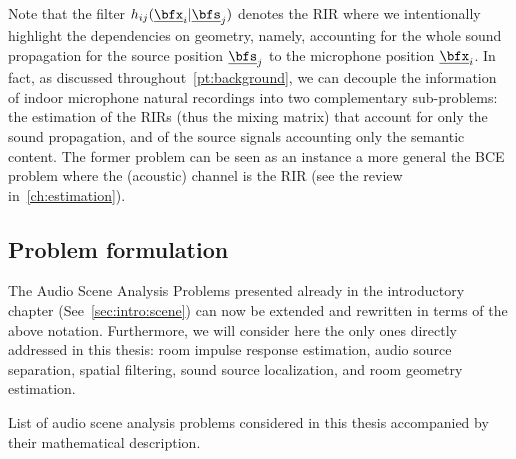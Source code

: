 Note that the filter $\flt_{\idxMicSrc}(\positionMicrophone_{\idxMic} | \positionSource_{\idxSrc})$ denotes the \ac{RIR} where we intentionally highlight the dependencies on geometry,
namely, accounting for the whole sound propagation for the source position $\positionSource_{\idxSrc}$ to the microphone position $\positionMicrophone_{\idxMic}$.
In fact, as discussed throughout~\cref{pt:background}, we can decouple the information of indoor microphone natural recordings into two complementary sub-problems:
the estimation of the \acp{RIR} (thus the mixing matrix) that account for only the sound propagation, and of the source signals accounting only the semantic content.
The former problem can be seen as an instance a more general the \acf{BCE} problem where the (acoustic) channel is the \ac{RIR} (see the review in~\cref{ch:estimation}).

\newcommand{\setMicSignals}{\ensuremath{\set{\mic_{\idxMic}}_\idxMic}}
\newcommand{\setSrcSignals}{\ensuremath{\set{\src_{\idxSrc}}_\idxSrc}}
\newcommand{\setSrcPositions}{\ensuremath{\set{\positionSource_{\idxSrc}}_\idxSrc}}
\newcommand{\setFltSignals}{\ensuremath{\set{\flt_{\idxMicSrc}(\positionMicrophone_{\idxMic} | \positionSource_{\idxSrc})}_{\idxMicSrc}}}


\subsection{Problem formulation}
The Audio Scene Analysis Problems presented already in the introductory chapter (See~\cref{sec:intro:scene}) can now be extended and rewritten in terms of the above notation.
Furthermore, we will consider here the only ones directly addressed in this thesis: room impulse response estimation, audio source separation, spatial filtering, sound source localization, and room geometry estimation.

\begin{table}[!h]

    \begin{fullwidth}
    \centering
    \small
    \renewcommand{\arraystretch}{1.3}

    
    \caption{List of audio scene analysis problems considered in this thesis accompanied by their mathematical description.}
    \label{tab:application:problems}

    \end{fullwidth}

\end{table}

